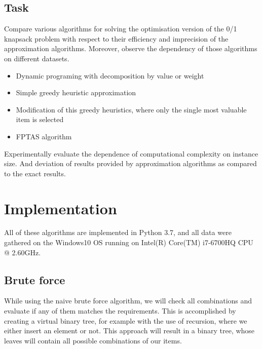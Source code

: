 \subsection{Task}
Compare various algorithms for solving the optimisation version of the 0/1 knapsack problem
with respect to their efficiency and imprecision of the approximation algorithms. Moreover,
observe the dependency of those algorithms on different datasets.

\begin{itemize}
    \item Dynamic programing with decomposition by value or weight
    \item Simple greedy heuristic approximation
    \item Modification of this greedy heuristics, where only the single most valuable item is selected
    \item FPTAS algorithm
\end{itemize}

Experimentally evaluate the dependence of computational complexity on instance size. And deviation of results provided by approximation algorithms as compared to the exact results.






















\section{Implementation}
All of these algorithms are implemented in Python 3.7, and all data were gathered on the Windows10
OS running on Intel(R) Core(TM) i7-6700HQ CPU @ 2.60GHz.


\subsection{Brute force}
While using the naive brute force algorithm, we will check all combinations
and evaluate if any of them matches the requirements. This is accomplished
by creating a virtual binary tree, for example with the use of recursion,
where we either insert an element or not. This approach will result in a
binary tree, whose leaves will contain all possible combinations of our items.


